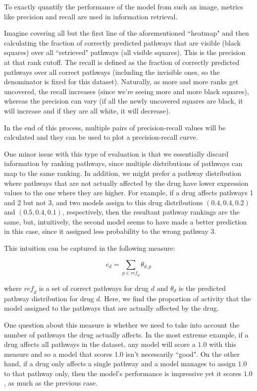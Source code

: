 \documentclass[12pt,a4paper,twoside,openright]{report}
\begin{document}
To exactly quantify the performance of the model from such an image, metrics like precision and recall are used in information retrieval. 

Imagine covering all but the first line of the aforementioned ``heatmap" and then calculating the fraction of correctly predicted pathways that are visible (black squares) over all ``retrieved" pathways (all visible squares). This is the precision at that rank cutoff. The recall is defined as the fraction of correctly predicted pathways over all correct pathways (including the invisible ones, so the denominator is fixed for this dataset). Naturally, as more and more ranks get uncovered, the recall increases (since we're seeing more and more black squares), whereas the precision can vary (if all the newly uncovered squares are black, it will increase and if they are all white, it will decrease).

In the end of this process, multiple pairs of precision-recall values will be calculated and they can be used to plot a precision-recall curve.

One minor issue with this type of evaluation is that we essentially discard information by ranking pathways, since multiple distributions of pathways can map to the same ranking. In addition, we might prefer a pathway distribution where pathways that are not actually affected by the drug have lower expression values to the one where they are higher. For example, if a drug affects pathways 1 and 2 but not 3, and two models assign to this drug distributions $(0.4, 0.4, 0.2)$ and $(0.5, 0.4, 0.1)$, respectively, then the resultant pathway rankings are the same, but, intuitively, the second model seems to have made a better prediction in this case, since it assigned less probability to the wrong pathway 3.

This intuition can be captured in the following measure:

\begin{equation}
c_d = \sum\limits_{p \in \mathit{ref}_d}{\theta_{d, p}}
\end{equation}

where $\mathit{ref}_d$ is a set of correct pathways for drug $d$ and $\theta_d$ is the predicted pathway distribution for drug $d$. Here, we find the proportion of activity that the model assigned to the pathways that are actually affected by the drug.

One question about this measure is whether we need to take into account the number of pathways the drug actually affects. In the most extreme example, if a drug affects all pathways in the dataset, any model will score a $1.0$ with this measure and so a model that scores 1.0 isn't necessarily ``good". On the other hand, if a drug only affects a single pathway and a model manages to assign $1.0$ to that pathway only, then the model's performance is impressive yet it scores $1.0$, as much as the previous case.
\end{document}
